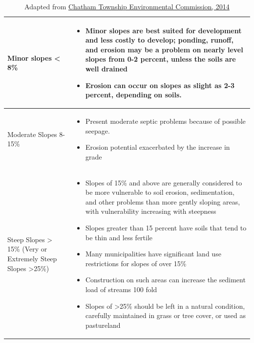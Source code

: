 \begin{table}
\begin{center}
\begin{tabular}{ | p{} p{}| } 
\hline
Minor slopes < 8\% &
    \begin{itemize}
    \item Minor slopes are best suited for development and less costly to 
    develop; ponding, runoff, and erosion may be a problem on nearly level 
    slopes from 0-2 percent, unless the soils are well drained
    \item Erosion can occur on slopes as slight as 2-3 percent, depending on
    soils.
    \end{itemize}
    \\
\hline
Moderate Slopes 8-15\% &
    \begin{itemize}
        \item Present moderate septic problems because of possible seepage.
        \item Erosion potential exacerbated by the increase in grade
    \end{itemize}
    \\
\hline
Steep Slopes > 15\% (Very or Extremely Steep Slopes >25\%) &
    \begin{itemize}
    \item Slopes of 15\% and above are generally considered to be more 
    vulnerable to soil erosion, sedimentation, and other problems than more 
    gently sloping areas, with vulnerability increasing with steepness
    \item Slopes greater than 15 percent have soils that tend to be thin and 
    less fertile
    \item Many municipalities have significant land use restrictions for slopes 
    of over 15\%
    \item Construction on such areas can increase the sediment load of streams 
    100 fold
    \item Slopes of  >25\% should be left in a natural condition, carefully 
    maintained in grass or tree cover, or used as pastureland
    \end{itemize}
\hline
\end{tabular}
\end{center}
\caption{Adapted from \href{http://www.chathamtownship-nj.gov/images/CTEC/NRI1999/slopesadd090704.pdf}{Chatham Township Environmental Commission, 2014}\label{tab:steepslopes}}
\end{table}

